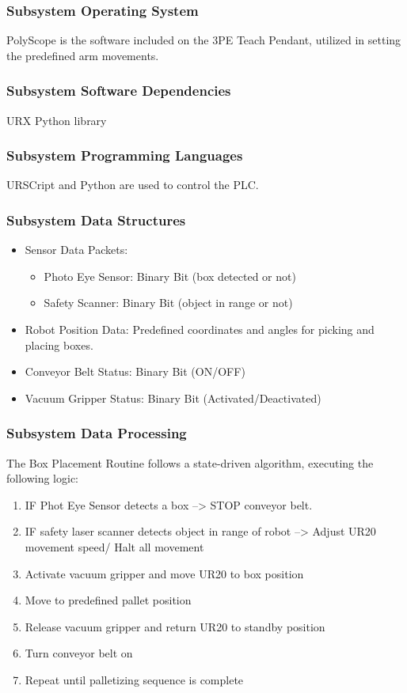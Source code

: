 \subsubsection{Subsystem Operating System}
PolyScope is the software included on the 3PE Teach Pendant, utilized in setting the predefined arm movements.

\subsubsection{Subsystem Software Dependencies}
URX Python library

\subsubsection{Subsystem Programming Languages}
URSCript and Python are used to control the PLC.

\subsubsection{Subsystem Data Structures}
\begin{itemize}
    \item Sensor Data Packets:
        \begin{itemize}
            \item Photo Eye Sensor: Binary Bit (box detected or not)
            \item Safety Scanner: Binary Bit (object in range or not)
        \end{itemize}
    \item Robot Position Data: Predefined coordinates and angles for picking and placing boxes.
    \item Conveyor Belt Status: Binary Bit (ON/OFF)
    \item Vacuum Gripper Status: Binary Bit (Activated/Deactivated)
\end{itemize}

\subsubsection{Subsystem Data Processing}
The Box Placement Routine follows a state-driven algorithm, executing the following logic:
\begin{enumerate}
    \item IF Phot Eye Sensor detects a box --> STOP conveyor belt.
    \item IF safety laser scanner detects object in range of robot --> Adjust UR20 movement speed/ Halt all movement
    \item Activate vacuum gripper and move UR20 to box position
    \item Move to predefined pallet position
    \item Release vacuum gripper and return UR20 to standby position
    \item Turn conveyor belt on
    \item Repeat until palletizing sequence is complete
\end{enumerate}